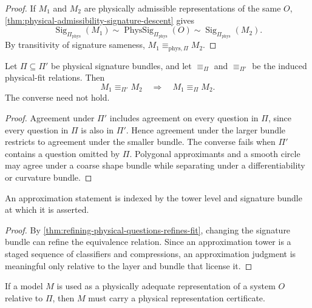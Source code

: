 \begin{proof}
If $M_1$ and $M_2$ are physically admissible representations of the same $O$, \autoref{thm:physical-admissibility-signature-descent} gives
$$
\operatorname{Sig}_{\Pi_{\mathrm{phys}}}(M_1)
\sim
\operatorname{PhysSig}_{\Pi_{\mathrm{phys}}}(O)
\sim
\operatorname{Sig}_{\Pi_{\mathrm{phys}}}(M_2).
$$
By transitivity of signature sameness, $M_1\equiv_{\mathrm{phys},\Pi}M_2$.
\end{proof}

\begin{theorem}
\label{thm:refining-physical-questions-refines-fit}
Let $\Pi\subseteq\Pi'$ be physical signature bundles, and let $\equiv_{\Pi}$ and $\equiv_{\Pi'}$ be the induced physical-fit relations. Then
$$
M_1\equiv_{\Pi'}M_2
\quad\Longrightarrow\quad
M_1\equiv_{\Pi}M_2.
$$
The converse need not hold.
\end{theorem}

\begin{proof}
Agreement under $\Pi'$ includes agreement on every question in $\Pi$, since every question in $\Pi$ is also in $\Pi'$. Hence agreement under the larger bundle restricts to agreement under the smaller bundle. The converse fails when $\Pi'$ contains a question omitted by $\Pi$. Polygonal approximants and a smooth circle may agree under a coarse shape bundle while separating under a differentiability or curvature bundle.
\end{proof}

\begin{corollary}
\label{cor:approximation-is-tower-relative}
An approximation statement is indexed by the tower level and signature bundle at which it is asserted.
\end{corollary}

\begin{proof}
By \autoref{thm:refining-physical-questions-refines-fit}, changing the signature bundle can refine the equivalence relation. Since an approximation tower is a staged sequence of classifiers and compressions, an approximation judgment is meaningful only relative to the layer and bundle that license it.
\end{proof}

\begin{theorem}
\label{thm:physical-adequacy-requires-representation-certificate}
If a model $M$ is used as a physically adequate representation of a system $O$ relative to $\Pi$, then $M$ must carry a physical representation certificate.
\end{theorem}

